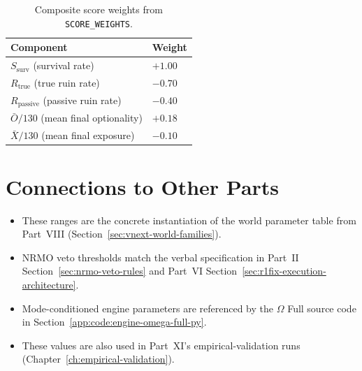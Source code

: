 \begin{table}[ht]
\centering
\small
\begin{tabularx}{\linewidth}{Xl}
\toprule
\textbf{Component} & \textbf{Weight} \\
\midrule
$S_{\mathrm{surv}}$ (survival rate) & $+1.00$ \\
$R_{\mathrm{true}}$ (true ruin rate) & $-0.70$ \\
$R_{\mathrm{passive}}$ (passive ruin rate) & $-0.40$ \\
$\bar O / 130$ (mean final optionality) & $+0.18$ \\
$\bar X / 130$ (mean final exposure) & $-0.10$ \\
\bottomrule
\end{tabularx}
\caption[Composite score weights]{Composite score weights from
\texttt{SCORE\_WEIGHTS}.}
\label{tab:score-weights}
\end{table}

\section*{Connections to Other Parts}

\begin{itemize}
\item These ranges are the concrete instantiation of the world
parameter table from Part~VIII
(Section~\ref{sec:vnext-world-families}).
\item NRMO veto thresholds match the verbal specification in
Part~II Section~\ref{sec:nrmo-veto-rules} and Part~VI
Section~\ref{sec:r1fix-execution-architecture}.
\item Mode-conditioned engine parameters are referenced by the
$\Omega$ Full source code in Section~\ref{app:code:engine-omega-full-py}.
\item These values are also used in Part~XI's empirical-validation
runs (Chapter~\ref{ch:empirical-validation}).
\end{itemize}

